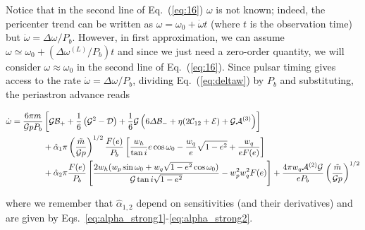 \documentclass[
    floats,
    floatfix,
    amssymb,
    prd,
    twocolumn,
    superscriptaddress,
    nofootinbib,
    unicode,
    colorlinks=true,
    linktocpage=true
]{revtex4-2}
\begin{document}
Notice that in the second line of Eq.~(\ref{eq:16}) $\omega$ is not known; indeed, the pericenter trend can be written as $\omega=\omega_0 + \dot{\omega}t$ (where $t$ is the observation time) but $\dot{\omega}=\Delta \omega /P_b$. However, in first approximation, we can assume  $ \omega \simeq \omega_0 + (\Delta \omega^{(L)}/P_b)t$ and since we just need a zero-order quantity, we will consider $\omega \approx \omega_0$  in the second line of  Eq.~(\ref{eq:16}). Since pulsar timing gives access to the rate $\dot{\omega} = \Delta\omega / P_b$, dividing Eq.~(\ref{eq:deltaw}) by $P_b$ and substituting, the periastron advance reads
\begin{widetext}
\begin{equation}
\begin{split}
 \dot{\omega} =  \frac{6\pi m}{{\cal G}p P_b}&\left[{\cal G}{\cal B}_++\frac{1}{6}\left({\cal G}^2-{\cal D}\right)+\frac{1}{6}{\cal G}\left(6 \Delta {\cal B}_- + \eta (2{\cal C}_{12}+{\cal E})+{\cal G}{\cal A}^{(3)}\right)\right]\\
 & + \hat{\alpha}_1 \pi  \left(\frac{\tilde{m}}{\mathcal{G}p} \right)^{1/2} \frac{F(e)}{P_b} \left[\frac{w_h}{\tan{i}} e \cos{\omega_0}-\frac{w_q}{e}\sqrt{1-e^2} +\frac{w_q}{e F(e)} \right] \\
 &  +  \hat{\alpha}_2 \pi \frac{F(e)}{P_b} \left[ \frac{2 w_h (w_p \sin \omega_0 + w_q \sqrt{1 - e^2} \cos \omega_0)}{\mathcal{G} \tan{i} \sqrt{1-e^2}}   - w_p^2 w_q^2 F(e) \right]+ \frac{4 \pi w_q \mathcal{A}^{(2)}\mathcal{G}}{e P_b} \left(\frac{\tilde{m}}{\mathcal{G}p}\right)^{1/2}
\end{split}
\end{equation}
\end{widetext}
where we remember that $\hat{\alpha}_{1,2}$ depend on sensitivities (and their derivatives) and are given by Eqs.~\eqref{eq:alpha_strong1}-\eqref{eq:alpha_strong2}.
\end{document}
